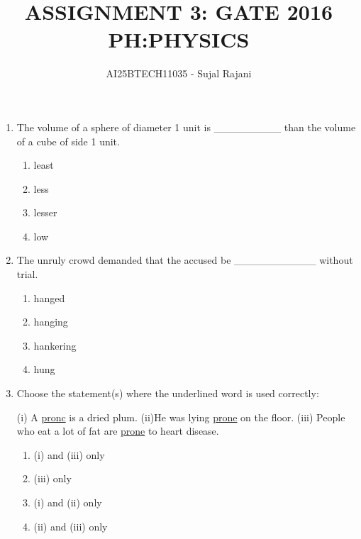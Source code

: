 \documentclass[journal,12pt,onecolumn]{IEEEtran}
\theoremstyle{remark}
\begin{document}
\title{
ASSIGNMENT 3: GATE 2016 \\
     PH:PHYSICS}
\author{AI25BTECH11035 - Sujal Rajani }
\maketitle
\renewcommand{\thefigure}{\theenumi}
\renewcommand{\thetable}{\theenumi}

\begin{enumerate}

\item The volume of a sphere of diameter 1 unit is \_\_\_\_\_\_\_\_\_ than the volume of a cube of side 1 unit.
\begin{multicols}{4}
\begin{enumerate}
    \item least
    \item less
    \item lesser
    \item low
\end{enumerate}
\end{multicols}

\item The unruly crowd demanded that the accused be \_\_\_\_\_\_\_\_\_\_\_ without trial.
\begin{multicols}{4}
\begin{enumerate}
    \item hanged
    \item hanging
    \item hankering
    \item hung
\end{enumerate}
\end{multicols}

\item Choose the statement(s) where the underlined word is used correctly:

(i) A \underline{pronc} is a dried plum. 
(ii)He was lying \underline{prone} on the floor. 
(iii) People who eat a lot of fat are \underline{prone} to heart disease.


\begin{multicols}{4}
\begin{enumerate}
    \item (i) and (iii) only
    \item (iii) only
    \item (i) and (ii) only
    \item (ii) and (iii) only
\end{enumerate}
\end{multicols}


\end{enumerate}
\end{document}
